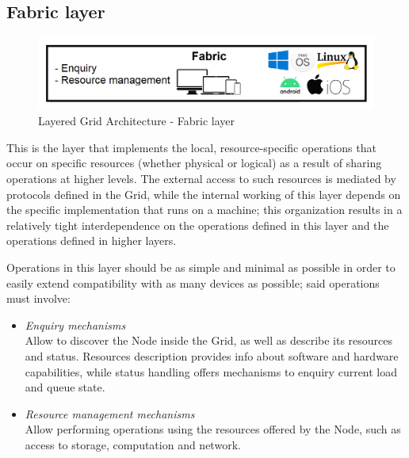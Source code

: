 \subsection{Fabric layer}
\begin{figure}[!ht]
    \centering
    \includegraphics[scale=0.35]{document/chapters/chapter_2/images/fabric_layer.png}
    \caption{Layered Grid Architecture - Fabric layer}
    \label{fig:fabric_layer}
\end{figure}

\noindent This is the layer that implements the local, resource-specific operations that occur on specific resources (whether physical or logical) as a result of sharing operations at higher levels. The external access to such resources is mediated by protocols defined in the Grid, while the internal working of this layer depends on the specific implementation that runs on a machine; this organization results in a relatively tight interdependence on the operations defined in this layer and the operations defined in higher layers.
\vspace{30mm}

Operations in this layer should be as simple and minimal as possible in order to easily extend compatibility with as many devices as possible; said operations must involve:
\begin{itemize}
    \item \textit{Enquiry mechanisms}\\
    Allow to discover the Node inside the Grid, as well as describe its resources and status. Resources description provides info about software and hardware capabilities, while status handling offers mechanisms to enquiry current load and queue state.
    \item \textit{Resource management mechanisms}\\
    Allow performing operations using the resources offered by the Node, such as access to storage, computation and network.
\end{itemize} 
\vspace{5mm}

